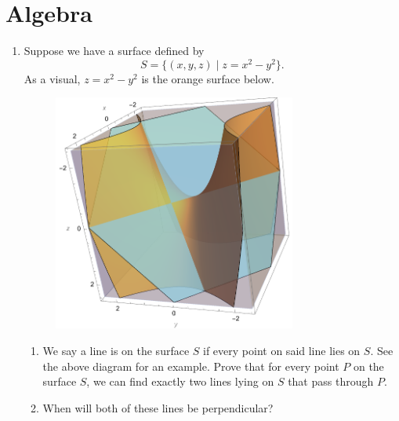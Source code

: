 \documentclass[11pt]{scrartcl}
\begin{document}
\section{Algebra}
\begin{enumerate}[label=\textbf{A\arabic*}.]
    \item Suppose we have a surface defined by
    \[ S = \{(x, y, z) \mid z = x^2 - y^2\}. \]
    As a visual, $z = x^2 - y^2$ is the orange surface below.
    
    \begin{figure}[h]
        \centering
        \includegraphics[width = 8cm]{weekly/week 15/Diagrams/ahoy.png}
        \hspace{2em}
        \label{fig:hyperbolic_surface}
    \end{figure}
    
    \begin{enumerate}
        \item We say a line is on the surface $S$ if every point on said line lies on $S$. See the above diagram for an example. Prove that for every point $P$ on the surface $S$, we can find exactly two lines lying on $S$ that pass through $P$.
        \item When will both of these lines be perpendicular?
    \end{enumerate}
\end{enumerate}

\newpage
\end{document}
